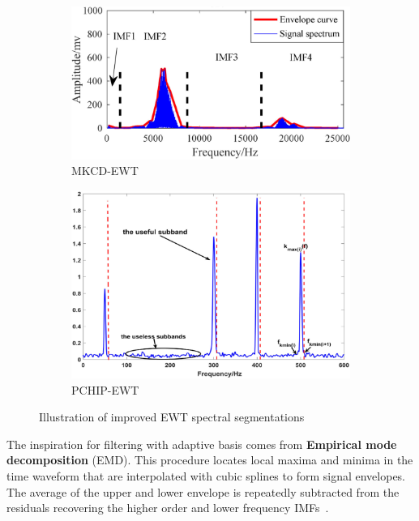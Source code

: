 \begin{figure}[ht]
    \centering
    \begin{subfigure}[b]{0.49\textwidth}
        \includegraphics[width=\textwidth]{assets/analysis/MKCD-EWT.png}
        \caption{MKCD-EWT~\cite{li_fault_2019}}
        \label{fig:mkcd-ewt-segmentation}
    \end{subfigure}
    \hfill
    \begin{subfigure}[b]{0.49\textwidth}
        \includegraphics[width=\textwidth]{assets/analysis/PCHIP-EWT.png}
        \caption{PCHIP-EWT~\cite{zhuang_improved_2020}}
        \label{fig:pchip-ewt-segmentation}
    \end{subfigure}
    \caption{Illustration of improved EWT spectral segmentations}
\end{figure}

The inspiration for filtering with adaptive basis comes from \textbf{Empirical mode decomposition} (EMD). This procedure locates local maxima and minima in the time waveform that are interpolated with cubic splines to form signal envelopes. The average of the upper and lower envelope is repeatedly subtracted from the residuals recovering the higher order and lower frequency IMFs~\cite{wang_computational_2014}. 


